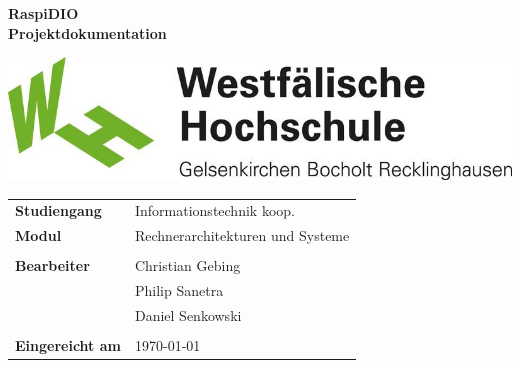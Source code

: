 \thispagestyle{empty}
\begin{center}
\textbf{\Large{RaspiDIO}}\\\vspace{1cm}
\textbf{Projektdokumentation}\\[3cm]
\end{center}
\includegraphics[width=\textwidth]{WH_Logo.jpg}

\vfill
\begin{center}
\begin{tabular}{ll}
\textbf{Studiengang} & Informationstechnik koop. \\
\textbf{Modul} & Rechnerarchitekturen und Systeme\\
& \\
\textbf{Bearbeiter} & Christian Gebing \\
\textbf & Philip Sanetra \\
\textbf & Daniel Senkowski \\
& \\
\textbf{Eingereicht am} & \today\\
\end{tabular}
\end{center}